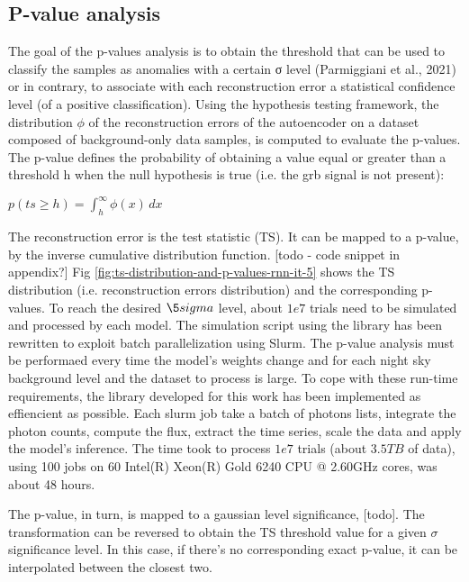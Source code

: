 \subsection{P-value analysis}
The goal of the p-values analysis is to obtain the threshold that can be used to classify the samples as anomalies with a certain σ level (Parmiggiani et al., 2021) or in contrary, to associate with each reconstruction error a statistical confidence level (of a positive classification). Using the hypothesis testing framework, the distribution $\phi$ of the reconstruction errors of the autoencoder on a dataset composed of background-only data samples, is computed to evaluate the p-values. The p-value defines the probability of obtaining a value equal or greater than a threshold h when the null hypothesis is true (i.e. the grb signal is not present):

\begin{math}
    p(ts \geq h) = \int_{h}^{\infty} \phi(x) \,dx
\end{math}

The reconstruction error is the test statistic (TS). It can be mapped to a p-value, by the inverse cumulative distribution function. [todo - code snippet in appendix?] Fig \ref{fig:ts-distribution-and-p-values-rnn-it-5} shows the TS distribution (i.e. reconstruction errors distribution) and the corresponding p-values. To reach the desired $\5sigma$
 level, about $1e7$ trials need to be simulated and processed by each model. The simulation script using the \cite{dipiano2022ctasagsci} library has been rewritten to exploit batch parallelization using Slurm. The p-value analysis must be performaed every time the model's weights change and for each night sky background level and the dataset to process is large. To cope with these run-time requirements, the library developed for this work has been implemented as effiencient as possible. Each slurm job take a batch of photons lists, integrate the photon counts, compute the flux, extract the time series, scale the data and apply the model's inference. The time took to process $1e7$ trials (about $3.5 TB$ of data), using 100 jobs on 60 Intel(R) Xeon(R) Gold 6240 CPU @ 2.60GHz cores, was about 48 hours. 
 
The p-value, in turn, is mapped to a gaussian level significance, [todo]. The transformation can be reversed to obtain the TS threshold value for a given $\sigma $significance level. In this case, if there's no corresponding exact p-value, it can be interpolated between the closest two. 

